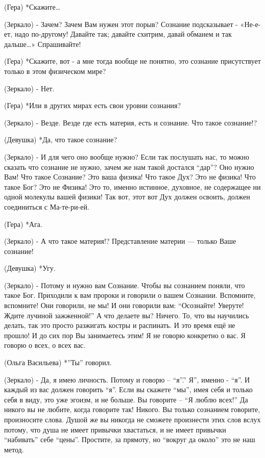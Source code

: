 (Гера) *Скажите…

(Зеркало) - Зачем? Зачем Вам нужен этот порыв? Сознание подсказывает - «Не-е-ет, надо по-другому! Давайте так; давайте схитрим, давай обманем и так дальше…» Спрашивайте!

 (Гера) *Скажите, вот - а мне тогда вообще не понятно, это сознание присутствует только в этом физическом мире? 

(Зеркало) -  Нет. 

(Гера) *Или в других мирах есть свои уровни сознания?

(Зеркало) - Везде. Везде где есть материя, есть и сознание. Что такое сознание!?

(Девушка) *Да, что такое сознание?

(Зеркало) - И для чего оно вообще нужно? Если так послушать нас,  то можно сказать что сознание не нужно, зачем же нам такой достался “дар”? Оно нужно Вам! Что такое Сознание?  Это ваша физика! Что такое Дух? Это не физика! Что такое Бог? Это не Физика! Это то, именно истинное, духовное, не содержащее ни одной молекулы вашей физики! Так вот, этот вот Дух должен освоить, должен соединиться с Ма-те-ри-ей. 

(Гера) *Ага.

(Зеркало) - А что такое материя!? Представление материи  — только Ваше сознание! 

(Девушка) *Угу.

(Зеркало)  -  Потому и нужно вам Сознание.  Чтобы вы сознанием поняли, что такое Бог. Приходили к вам пророки и говорили о вашем Сознании. Вспомните, вспомните! Они говорили, не мы! И они говорили вам: “Осознайте! Уверуте! Ждите лучиной зажженной!” А что делаете вы? Ничего. То, что вы научились делать, так это просто разжигать костры и распинать. И это время ещё не прошло!  И до сих пор Вы занимаетесь этим! Я не говорю конкретно о вас. Я говорю о всех, о всех вас.  

(Ольга Васильева) *”Ты” говорил.

(Зеркало) - Да, я имею личность. Потому и говорю – “я”.” Я”, именно - “я”. И каждый из вас должен говорить “я”. Если вы скажете “мы”, имея себя и только себя в виду, это уже эгоизм, и не больше. Вы говорите – “Я люблю всех!” Да никого вы не любите, когда говорите так! Никого. Вы только сознанием говорите, произносите слова. Душой же вы никогда не сможете произнести этих слов вслух потому, что душа не имеет привычки хвастаться, и не имеет привычки “набивать” себе “цены”. Простите, за прямоту, но “вокруг да около” это не наш метод. 

